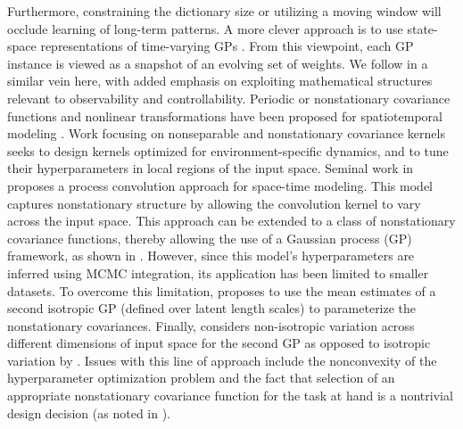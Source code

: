 Furthermore, constraining the dictionary size or utilizing a moving window will occlude learning of long-term patterns. A more clever approach is to use state-space representations of time-varying GPs \cite{sarkka2014convergence,hartikainen2013sequential}. From this viewpoint, each GP instance is viewed as a snapshot of an evolving set of weights. We follow in a similar vein here, with added emphasis on exploiting mathematical structures relevant to observability and controllability. Periodic or nonstationary covariance functions and nonlinear transformations have been proposed for spatiotemporal modeling \cite{ma2003nonstationary,RasmussenWilliams2005}. Work focusing on nonseparable and nonstationary covariance kernels seeks to design kernels optimized for environment-specific dynamics, and to tune their hyperparameters in local regions of the input space. Seminal work in \cite{higdon1998process} proposes a process convolution approach for space-time modeling. This model captures nonstationary structure by allowing the convolution kernel to vary across the input space. This approach can be extended to a class of nonstationary covariance functions, thereby allowing the use of a Gaussian process (GP) framework, as shown in \cite{paciorek2004nonstationary}. However,  since this model's hyperparameters are inferred using MCMC integration, its application has been limited to smaller datasets. To overcome this limitation, \cite{plagemann2008nonstationary} proposes to use the mean estimates of a second isotropic GP (defined over latent length scales) to parameterize the nonstationary covariances. Finally, \cite{garg2012AAAI} considers non-isotropic variation across different dimensions of input space for the second GP as opposed to isotropic variation by \cite{plagemann2008nonstationary}. Issues with this line of approach include the nonconvexity of the hyperparameter optimization problem and the fact that selection of an appropriate nonstationary covariance function for the task at hand is a nontrivial design decision (as noted in \cite{singh2010modeling}). 

